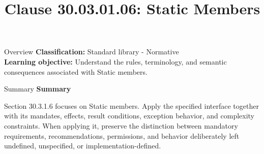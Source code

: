 \documentclass[10pt,letterpaper]{article}
\title{Clause 30.03.01.06: Static Members}
\author{}
\date{}
\begin{document}
\maketitle
\begin{CornellOverviewBox}{Overview}
\textbf{Classification:} Standard library - Normative\\[2pt]
\textbf{Learning objective:} Understand the rules, terminology, and semantic consequences associated with Static members.
\end{CornellOverviewBox}\begin{CornellSummaryBox}{Summary}
{\sffamily\bfseries\color{Accent} Summary}\par\vspace{3pt}Section 30.3.1.6 focuses on Static members. Apply the specified interface together with its mandates, effects, result conditions, exception behavior, and complexity constraints. When applying it, preserve the distinction between mandatory requirements, recommendations, permissions, and behavior deliberately left undefined, unspecified, or implementation-defined.
\end{CornellSummaryBox}
\end{document}
